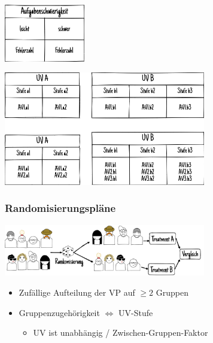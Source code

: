 \documentclass[
]{book}
\providecommand{\tightlist}{%
  \setlength{\itemsep}{0pt}\setlength{\parskip}{0pt}}
\begin{document}
\begin{center}\includegraphics[width=100pt]{imgs/plan2} \end{center}

\begin{center}\includegraphics[width=250pt]{imgs/plan3} \end{center}

\hypertarget{randomisierungspluxe4ne}{%
\subsubsection{Randomisierungspläne}\label{randomisierungspluxe4ne}}

\begin{center}\includegraphics[width=250pt]{imgs/plan4} \end{center}

\begin{itemize}
\tightlist
\item
  Zufällige Aufteilung der VP auf \(\geq 2\) Gruppen
\item
  Gruppenzugehörigkeit \(\Leftrightarrow\) UV-Stufe

  \begin{itemize}
  \tightlist
  \item
    UV ist unabhängig / Zwischen-Gruppen-Faktor
  \end{itemize}
\end{itemize}
\end{document}
